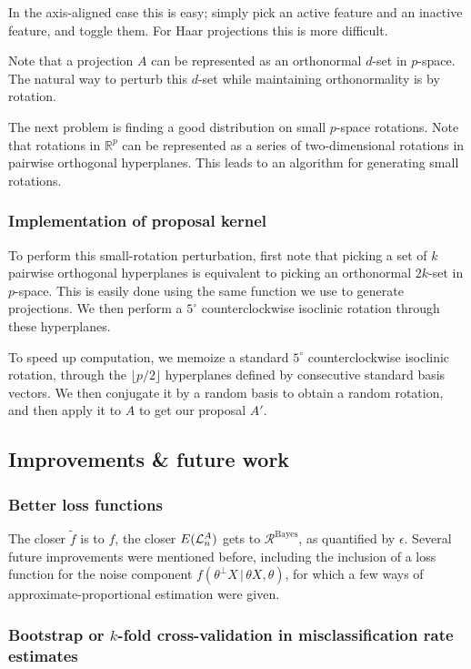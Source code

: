 \documentclass[ejs,preprint]{imsart}
\newcommand\E{\mathbb{E}}
\newcommand\risk{\mathcal{L}}
\newcommand\rrisk{\mathcal{R}}
\begin{document}
In the axis-aligned case this is easy; simply pick an active feature and an inactive feature, and toggle them. For Haar projections this is more difficult.

Note that a projection $A$ can be represented as an orthonormal $d$-set in $p$-space. The natural way to perturb this $d$-set while maintaining orthonormality is by rotation.

The next problem is finding a good distribution on small $p$-space rotations. Note that rotations in $\mathbb R^p$ can be represented as a series of two-dimensional rotations in pairwise orthogonal hyperplanes. This leads to an algorithm for generating small rotations.

\subsubsection{Implementation of proposal kernel}

To perform this small-rotation perturbation, first note that picking a set of $k$ pairwise orthogonal hyperplanes is equivalent to picking an orthonormal $2k$-set in $p$-space. This is easily done using the same function we use to generate projections. We then perform a $5^\circ$ counterclockwise isoclinic rotation through these hyperplanes.

To speed up computation, we memoize a standard $5^\circ$ counterclockwise isoclinic rotation, through the $\lfloor p/2 \rfloor$ hyperplanes defined by consecutive standard basis vectors. We then conjugate it by a random basis to obtain a random rotation, and then apply it to $A$ to get our proposal $A'$.

\subsection{Improvements \& future work}

\subsubsection{Better loss functions}

The closer $\tilde f$ is to $f$, the closer $\mathbb \E(\risk^A_n)$ gets to $\rrisk^\mathrm{Bayes}$, as quantified by $\epsilon$. Several future improvements were mentioned before, including the inclusion of a loss function for the noise component $f(\theta^\perp X\,|\,\theta X, \theta)$, for which a few ways of approximate-proportional estimation were given.

\subsubsection{Bootstrap or $k$-fold cross-validation in misclassification rate estimates}
\end{document}
